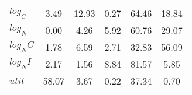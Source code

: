 \begin{center}
\begin{longtable}{lccccc}
$log_C         $	 & 	        3.49	 & 	       12.93	 & 	        0.27	 & 	       64.46	 & 	       18.84 \\ 
$log_N         $	 & 	        0.00	 & 	        4.26	 & 	        5.92	 & 	       60.76	 & 	       29.07 \\ 
$log_NC        $	 & 	        1.78	 & 	        6.59	 & 	        2.71	 & 	       32.83	 & 	       56.09 \\ 
$log_NI        $	 & 	        2.17	 & 	        1.56	 & 	        8.84	 & 	       81.57	 & 	        5.85 \\ 
$util          $	 & 	       58.07	 & 	        3.67	 & 	        0.22	 & 	       37.34	 & 	        0.70 \\ 
\end{longtable}
 \end{center}
